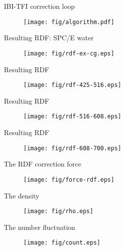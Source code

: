 \documentclass{beamer}
\begin{document}
\begin{frame}{IBI-TFI correction loop}
  \begin{figure}
    \centering 
    \texttt{[image: fig/algorithm.pdf]}
  \end{figure}
\end{frame}

\begin{frame}{Resulting RDF: SPC/E water}
  \begin{figure}
    \centering 
    \texttt{[image: fig/rdf-ex-cg.eps]}
  \end{figure}  
\end{frame}

\begin{frame}{Resulting RDF}
  \begin{figure}
    \centering 
    \texttt{[image: fig/rdf-425-516.eps]}
  \end{figure}  
\end{frame}

\begin{frame}{Resulting RDF}
  \begin{figure}
    \centering 
    \texttt{[image: fig/rdf-516-608.eps]}
  \end{figure}  
\end{frame}

\begin{frame}{Resulting RDF}
  \begin{figure}
    \centering 
    \texttt{[image: fig/rdf-608-700.eps]}
  \end{figure}  
\end{frame}


\begin{frame}{The RDF correction force}
  \begin{figure}
    \centering 
    \texttt{[image: fig/force-rdf.eps]}
  \end{figure}    
\end{frame}

\begin{frame}{The density}
  \begin{figure}
    \centering 
    \texttt{[image: fig/rho.eps]}
  \end{figure}    
\end{frame}

\begin{frame}{The number fluctuation}
  \begin{figure}
    \centering 
    \texttt{[image: fig/count.eps]}
  \end{figure}    
\end{frame}
\end{document}
